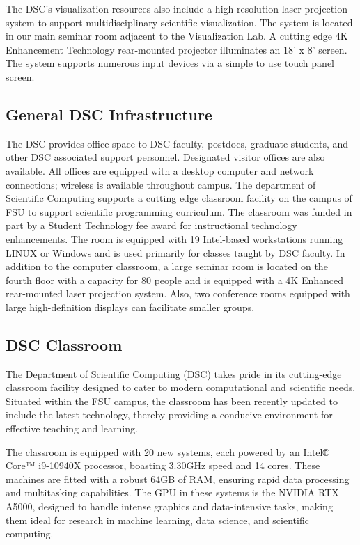 \documentclass[12pt,a4paper]{article}
\begin{document}
The DSC's visualization resources also include a high-resolution laser projection system to support multidisciplinary scientific visualization. The system is located in our main seminar room adjacent to the Visualization Lab. A cutting edge 4K Enhancement Technology rear-mounted projector illuminates an 18' x 8' screen. The system supports numerous input devices via a simple to use touch panel screen.

\subsection*{General DSC Infrastructure}
The DSC provides office space to DSC faculty, postdocs, graduate students, and other DSC associated support personnel. Designated visitor offices are also available. All offices are equipped with a desktop computer and network connections; wireless is available throughout campus. The department of Scientific Computing supports a cutting edge classroom facility on the campus of FSU to support scientific programming curriculum. The classroom was funded in part by a Student Technology fee award for instructional technology enhancements. The room is equipped with 19 Intel-based workstations running LINUX or Windows and is used primarily for classes taught by DSC faculty. In addition to the computer classroom, a large seminar room is located on the fourth floor with a capacity for 80 people and is equipped with a 4K Enhanced rear-mounted laser projection system. Also, two conference rooms equipped with large high-definition displays can facilitate smaller groups.

\subsection*{DSC Classroom}
The Department of Scientific Computing (DSC) takes pride in its cutting-edge classroom facility designed to cater to modern computational and scientific needs. Situated within the FSU campus, the classroom has been recently updated to include the latest technology, thereby providing a conducive environment for effective teaching and learning.

The classroom is equipped with 20 new systems, each powered by an Intel® Core™ i9-10940X processor, boasting 3.30GHz speed and 14 cores. These machines are fitted with a robust 64GB of RAM, ensuring rapid data processing and multitasking capabilities. The GPU in these systems is the NVIDIA RTX A5000, designed to handle intense graphics and data-intensive tasks, making them ideal for research in machine learning, data science, and scientific computing.
\end{document}
